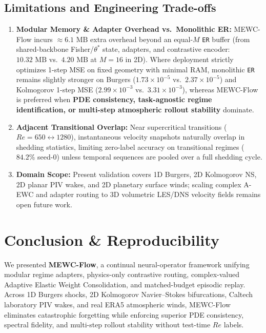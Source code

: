 \documentclass[11pt,a4paper]{article}
\begin{document}
\subsection*{Limitations and Engineering Trade-offs}
\begin{enumerate}
  \item \textbf{Modular Memory \& Adapter Overhead vs.\ Monolithic ER:} MEWC-Flow incurs $\approx 6.1\text{ MB}$ extra overhead beyond an equal-$M$ \texttt{ER} buffer (from shared-backbone Fisher/$\theta^*$ state, adapters, and contrastive encoder: $10.32\text{ MB}$ vs.\ $4.20\text{ MB}$ at $M=16$ in 2D). Where deployment strictly optimizes 1-step MSE on fixed geometry with minimal RAM, monolithic \texttt{ER} remains slightly stronger on Burgers ($1.73 \times 10^{-5}$ vs.\ $2.37 \times 10^{-5}$) and Kolmogorov 1-step MSE ($2.99 \times 10^{-3}$ vs.\ $3.31 \times 10^{-3}$), whereas MEWC-Flow is preferred when \textbf{PDE consistency, task-agnostic regime identification, or multi-step atmospheric rollout stability} dominate.
  \item \textbf{Adjacent Transitional Overlap:} Near supercritical transitions ($Re=650 \leftrightarrow 1280$), instantaneous velocity snapshots naturally overlap in shedding statistics, limiting zero-label accuracy on transitional regimes ($84.2\%$ seed-0) unless temporal sequences are pooled over a full shedding cycle.
  \item \textbf{Domain Scope:} Present validation covers 1D Burgers, 2D Kolmogorov NS, 2D planar PIV wakes, and 2D planetary surface winds; scaling complex A-EWC and adapter routing to 3D volumetric LES/DNS velocity fields remains open future work.
\end{enumerate}

\section{Conclusion \& Reproducibility}

We presented \textbf{MEWC-Flow}, a continual neural-operator framework unifying modular regime adapters, physics-only contrastive routing, complex-valued Adaptive Elastic Weight Consolidation, and matched-budget episodic replay. Across 1D Burgers shocks, 2D Kolmogorov Navier--Stokes bifurcations, Caltech laboratory PIV wakes, and real ERA5 atmospheric winds, MEWC-Flow eliminates catastrophic forgetting while enforcing superior PDE consistency, spectral fidelity, and multi-step rollout stability without test-time $Re$ labels.
\end{document}
